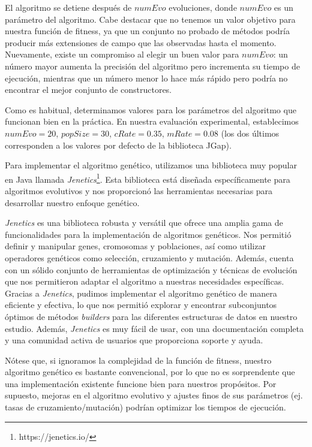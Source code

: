 El algoritmo se detiene después de $numEvo$ evoluciones, donde $numEvo$ es un parámetro del algoritmo. 
Cabe destacar que no tenemos un valor objetivo para nuestra función de fitness, 
ya que un conjunto no probado de métodos podría producir más extensiones de campo que las observadas hasta el momento. 
Nuevamente, existe un compromiso al elegir un buen valor para $numEvo$: un número mayor aumenta la precisión del algoritmo pero incrementa su tiempo de ejecución, 
mientras que un número menor lo hace más rápido pero podría no encontrar el mejor conjunto de constructores.

Como es habitual, determinamos valores para los parámetros del algoritmo que funcionan bien en la práctica. 
En nuestra evaluación experimental, establecimos $numEvo=20$, $popSize=30$, $cRate=0.35$, $mRate=0.08$ 
(los dos últimos corresponden a los valores por defecto de la biblioteca JGap).

Para implementar el algoritmo genético, utilizamos una biblioteca muy popular en Java llamada \emph{Jenetics}\footnote{https://jenetics.io/}. Esta biblioteca está diseñada específicamente para algoritmos evolutivos y nos proporcionó las herramientas necesarias para desarrollar nuestro enfoque genético.

\emph{Jenetics} es una biblioteca robusta y versátil que ofrece una amplia gama de funcionalidades para la implementación de algoritmos genéticos. Nos permitió definir y manipular genes, cromosomas y poblaciones, así como utilizar operadores genéticos como selección, cruzamiento y mutación. Además, cuenta con un sólido conjunto de herramientas de optimización y técnicas de evolución que nos permitieron adaptar el algoritmo a nuestras necesidades específicas.
Gracias a \emph{Jenetics}, pudimos implementar el algoritmo genético de manera eficiente y efectiva, lo que nos permitió explorar y encontrar subconjuntos óptimos de métodos \emph{builders} para las diferentes estructuras de datos en nuestro estudio. Además, \emph{Jenetics} es muy fácil de usar, con una documentación completa y una comunidad activa de usuarios que proporciona soporte y ayuda.

Nótese que, si ignoramos la complejidad de la función de fitness, nuestro algoritmo genético es bastante convencional, 
por lo que no es sorprendente que una implementación existente funcione bien para nuestros propósitos.
Por supuesto, mejoras en el algoritmo evolutivo y ajustes finos de sus parámetros (ej. tasas de cruzamiento/mutación) podrían optimizar los tiempos de ejecución.

